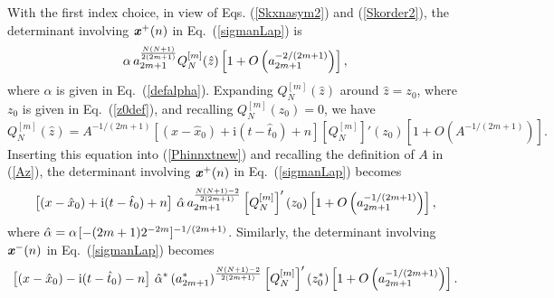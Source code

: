 \documentclass[amsmath,amssymb]{revtex4}
\def\[{\begin{equation}}
\def\]{\end{equation}}
\begin{document}
With the first index choice, in view of Eqs. (\ref{Skxnasym2}) and (\ref{Skorder2}), the determinant involving $\textbf{\emph{x}}^{+}(n)$ in Eq.~(\ref{sigmanLap}) is
\[ \label{Phinnxtnew}
\alpha \hspace{0.06cm} a_{2m+1}^{\frac{N(N+1)}{2(2m+1)}}Q_{N}^{[m]}(\hat{z}) \left[1+O\left(a_{2m+1}^{-2/(2m+1)}\right)\right],
\]
where $\alpha$ is given in Eq.~(\ref{defalpha}). Expanding $Q_{N}^{[m]}(\hat{z})$ around $\hat{z}=z_0$, where $z_0$ is given in Eq.~(\ref{z0def}), and recalling $Q_{N}^{[m]}(z_0)=0$, we have
\[
Q_{N}^{[m]}(\hat{z})=A^{-1/(2m+1)}\left[(x-\hat{x}_{0})+\textrm{i}(t-\hat{t}_{0})+n\right]\left[Q_{N}^{[m]}\right]'(z_0)
\left[1+O\left(A^{-1/(2m+1)}\right)\right].
\]
Inserting this equation into (\ref{Phinnxtnew}) and recalling the definition of $A$ in (\ref{Az}), the determinant involving $\textbf{\emph{x}}^{+}(n)$ in Eq.~(\ref{sigmanLap}) becomes
\[
\left[(x-\hat{x}_{0})+\textrm{i}(t-\hat{t}_{0})+n\right] \hspace{0.06cm} \hat{\alpha} \hspace{0.06cm} a_{2m+1}^{\frac{N(N+1)-2}{2(2m+1)}}\left[Q_{N}^{[m]}\right]'(z_0)\left[1+O\left(a_{2m+1}^{-1/(2m+1)}\right)\right],
\]
where $\hat{\alpha}=\alpha \hspace{0.04cm} [-(2m+1)2^{-2m}]^{-1/(2m+1)}$. Similarly, the
determinant involving $\textbf{\emph{x}}^{-}(n)$ in Eq.~(\ref{sigmanLap}) becomes
\[
\left[(x-\hat{x}_{0})-\textrm{i}(t-\hat{t}_{0})-n\right] \hspace{0.06cm} \hat{\alpha}^* \hspace{0.06cm} (a_{2m+1}^*)^{\frac{N(N+1)-2}{2(2m+1)}}\left[Q_{N}^{[m]}\right]'(z_0^*)\left[1+O\left(a_{2m+1}^{-1/(2m+1)}\right)\right].
\]
\end{document}
